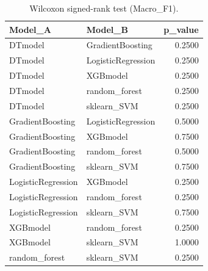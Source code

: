 \begin{table}[t]
\centering
\begin{tabular}{llr}
\toprule
Model_A & Model_B & p_value \\
\midrule
DTmodel & GradientBoosting & 0.2500 \\
DTmodel & LogisticRegression & 0.2500 \\
DTmodel & XGBmodel & 0.2500 \\
DTmodel & random_forest & 0.2500 \\
DTmodel & sklearn_SVM & 0.2500 \\
GradientBoosting & LogisticRegression & 0.5000 \\
GradientBoosting & XGBmodel & 0.7500 \\
GradientBoosting & random_forest & 0.5000 \\
GradientBoosting & sklearn_SVM & 0.7500 \\
LogisticRegression & XGBmodel & 0.2500 \\
LogisticRegression & random_forest & 0.2500 \\
LogisticRegression & sklearn_SVM & 0.7500 \\
XGBmodel & random_forest & 0.2500 \\
XGBmodel & sklearn_SVM & 1.0000 \\
random_forest & sklearn_SVM & 0.2500 \\
\bottomrule
\end{tabular}
\caption{Wilcoxon signed-rank test (Macro_F1).}
\label{tab:wilcoxon_Macro_F1}
\end{table}